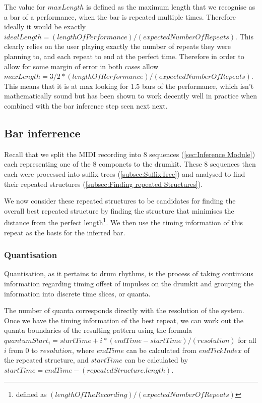 \documentclass[12pt,twoside,notitlepage]{report}
\begin{document}
		The value for $maxLength$ is defined as the maximum length that we recognise as a bar of a performance, when the bar is repeated multiple times. Therefore ideally it would be exactly $idealLength = (lengthOfPerformance)/(expectedNumberOfRepeats)$. This clearly relies on the user playing exactly the number of repeats they were planning to, and each repeat to end at the perfect time. Therefore in order to allow for some margin of error in both cases allow $maxLength = 3/2*(lengthOfRerformance)/(expectedNumberOfRepeats)$. This means that it is at max looking for 1.5 bars of the performance, which isn't mathematically sound but has been shown to work decently well in practice when combined with the bar inference step seen next next.
		
		
		\subsection{Bar inferrence}\label{subsec:barinference}
		Recall that we split the MIDI recording into 8 sequences (\ref{sec:Inference Module}) each representing one of the 8 componets to the drumkit. These 8 sequences then each were processed into suffix trees (\ref{subsec:SuffixTree}) and analysed to find their repeated structures (\ref{subsec:Finding repeated Structures}).
		
		We now consider these repeated structures to be candidates for finding the overall best repeated structure by finding the structure that minimises the distance from the perfect length\footnote{defined as $(length Of The Recording)/(expected Number Of Repeats)$}. We then use the timing information of this repeat as the basis for the inferred bar.
		
			\subsubsection{Quantisation}\label{Quantisation}
			Quantisation, as it pertains to drum rhythms, is the process of taking continious information regarding timing offset of impulses on the drumkit and grouping the information into discrete time slices, or quanta. 
			
			The number of quanta corresponds directly with the resolution of the system. Once we have the timing information of the best repeat, we can work out the quanta boundaries of the resulting pattern using the formula $quantumStart_i = startTime + i*(endTime-startTime)/(resolution)$ for all $i$ from $0$ to $resolution$, where $endTime$ can be calculated from $endTickIndex$ of the repeated structure, and $startTime$ can be calculated by $startTime = endTime-(repeatedStructure.length)$.
			
\end{document}
